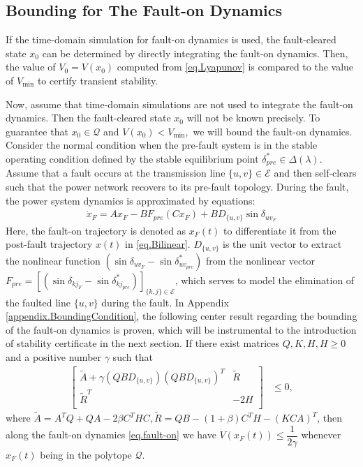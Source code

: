 \documentclass[final]{IEEEtran}
\begin{document}
\subsection{Bounding for The Fault-on Dynamics}

If the time-domain simulation for fault-on dynamics is used, the
fault-cleared state $x_0$ can be determined by directly
integrating the fault-on dynamics. Then, the value of $V_0 =
V(x_0)$ computed from \eqref{eq.Lyapunov} is compared to the value
of $V_{\min}$ to certify transient stability.


Now, assume that time-domain simulations are not used to integrate
the fault-on dynamics. Then the fault-cleared state $x_0$ will not
be known precisely. To guarantee that $x_0 \in \mathcal{Q}$ and $V
(x_0) < V_{\min},$ we will bound the fault-on dynamics. Consider
the normal condition when the pre-fault system is in the stable
operating condition defined by the stable equilibrium point
$\delta^*_{pre}\in \Delta(\lambda).$ Assume that a fault occurs at
the transmission line $\{u,v\} \in \mathcal{E}$ and then
self-clears such that the power network recovers to its pre-fault
topology.
During the fault, the power system dynamics is approximated by equations:
\begin{align}
\label{eq.fault-on} \dot{x}_F=Ax_F-BF_{pre}(Cx_F) +
BD_{\{u,v\}}\sin\delta_{{uv}_F}
\end{align}
Here, the fault-on trajectory is denoted as $x_F(t)$ to
differentiate it from the post-fault trajectory $x(t)$ in
\eqref{eq.Bilinear}. $D_{\{u,v\}}$ is the unit vector to extract
the nonlinear function
$(\sin\delta_{{uv}_F}-\sin\delta^*_{{uv}_{pre}})$ from the
nonlinear vector
$F_{pre}=[(\sin\delta_{{kj}_F}-\sin\delta^*_{{kj}_{pre}})]_{\{k,j\}\in\mathcal{E}}$,
which serves to model the elimination of the faulted line
$\{u,v\}$ during the fault. In Appendix
\ref{appendix.BoundingCondition}, the following center result
regarding the bounding of the fault-on dynamics is proven, which
will be instrumental to the introduction of stability certificate
in the next section. If there exist matrices $Q,K,H, H\ge 0$ and a
positive number $\gamma$ such that
\begin{align}
\label{eq.BoundingCondition}
    \left[   \begin{array}{ccccc}
          \tilde{A}+ \gamma (QBD_{\{u,v\}})(QBD_{\{u,v\}})^T  & \tilde{R} \\
          \tilde{R}^T  & -2H\\
        \end{array}\right] &\le 0,
\end{align}
where $\tilde{A}=A^TQ+QA - 2\beta C^THC,\tilde{R} =
QB-(1+\beta)C^TH-(KCA)^T$, then along the fault-on dynamics
\eqref{eq.fault-on} we have $\dot{V}(x_F(t)) \le
\dfrac{1}{2\gamma}$ whenever $x_F(t)$ being in the polytope
$\mathcal{Q}.$
\end{document}

